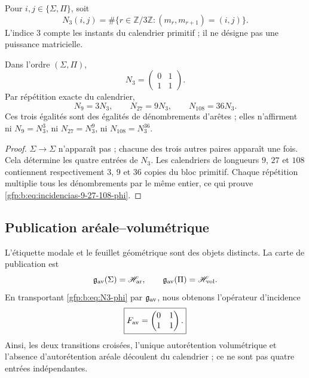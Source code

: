 \begin{definition}
Pour \(i,j\in\{\Sigma,\Pi\}\), soit
\[
 N_3(i,j)=
 \#\{r\in\mathbb Z/3\mathbb Z:(m_r,m_{r+1})=(i,j)\}.
\]
L’indice \(3\) compte les instants du calendrier primitif ; il ne désigne pas une
puissance matricielle.
\end{definition}

\begin{theorem}
\label{gfp:b:thm:descenso-incidencia-modal-phi}
Dans l’ordre \((\Sigma,\Pi)\),
\begin{equation}
 \boxed{
 N_3=
 \begin{pmatrix}
 0&1\\
 1&1
 \end{pmatrix}.}
 \label{gfp:b:eq:N3-phi}
\end{equation}
Par répétition exacte du calendrier,
\begin{equation}
 \boxed{
 N_9=3N_3,
 \qquad
 N_{27}=9N_3,
 \qquad
 N_{108}=36N_3.}
 \label{gfp:b:eq:incidencias-9-27-108-phi}
\end{equation}
Ces trois égalités sont des égalités de dénombrements d’arêtes ; elles n’affirment
ni \(N_9=N_3^3\), ni \(N_{27}=N_3^9\), ni \(N_{108}=N_3^{36}\).
\end{theorem}

\begin{proof}
\(\Sigma\to\Sigma\) n’apparaît pas ; chacune des trois autres paires apparaît
une fois. Cela détermine les quatre entrées de \(N_3\). Les calendriers de
longueurs \(9\), \(27\) et \(108\) contiennent respectivement \(3\), \(9\)
et \(36\) copies du bloc primitif. Chaque répétition multiplie tous les
dénombrements par le même entier, ce qui prouve
\eqref{gfp:b:eq:incidencias-9-27-108-phi}.
\end{proof}

\subsection{Publication aréale--volumétrique}

L’étiquette modale et le feuillet géométrique sont des objets distincts. La carte
de publication est
\[
 \mathfrak g_{\rm av}(\Sigma)=\mathscr H_{\rm ar},
 \qquad
 \mathfrak g_{\rm av}(\Pi)=\mathscr H_{\rm vol}.
\]
En transportant \eqref{gfp:b:eq:N3-phi} par \(\mathfrak g_{\rm av}\), nous obtenons
l’opérateur d’incidence
\begin{equation}
 \boxed{
 F_{\rm av}=
 \begin{pmatrix}
 0&1\\
 1&1
 \end{pmatrix}.}
 \label{gfp:b:eq:Fav-derivada-phi}
\end{equation}
Ainsi, les deux transitions croisées, l’unique autorétention volumétrique et
l’absence d’autorétention aréale découlent du calendrier ; ce ne sont pas quatre
entrées indépendantes.

